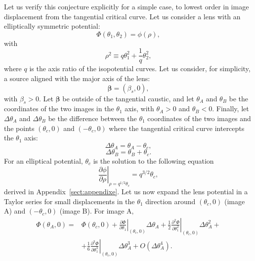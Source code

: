 \documentclass[usenatbib]{mnras}
\begin{document}
Let us verify this conjecture explicitly for a simple case, to lowest order in image displacement from the tangential critical curve.
Let us consider a lens with an elliptically symmetric potential:
\begin{equation}\label{eq:potell}
\Phi(\theta_1, \theta_2) = \phi(\rho),
\end{equation} 
with
\begin{equation}
\rho^2 \equiv q\theta_1^2 + \frac1q\theta_2^2,
\end{equation}
where $q$ is the axis ratio of the isopotential curves.
Let us consider, for simplicity, a source aligned with the major axis of the lens:
\begin{equation}
\boldsymbol\beta = (\beta_s, 0),
\end{equation}
with $\beta_s > 0$.
Let $\boldsymbol\beta$ be outside of the tangential caustic, and let $\theta_A$ and $\theta_B$ be the coordinates of the two images in the $\theta_1$ axis, with $\theta_A > 0$ and $\theta_B < 0$.
Finally, let $\Delta\theta_A$ and $\Delta\theta_B$ be the difference between the $\theta_1$ coordinates of the two images and the points $(\theta_c,0)$ and $(-\theta_c,0)$ where the tangential critical curve intercepts the $\theta_1$ axis:
\begin{equation}
\Delta\theta_A = \theta_A - \theta_c,
\end{equation}
\begin{equation}
\Delta\theta_B = \theta_B + \theta_c.
\end{equation}
For an elliptical potential, $\theta_c$ is the solution to the following equation
\begin{equation}\label{eq:critell}
\left.\frac{\partial\phi}{\partial\rho}\right\rvert_{\rho=q^{1/2}\theta_c} = q^{3/2}\theta_c,
\end{equation}
derived in Appendix~\ref{sect:appendixe}.
Let us now expand the lens potential in a Taylor series for small displacements in the $\theta_1$ direction around $(\theta_c, 0)$ (image A) and $(-\theta_c, 0)$ (image B).
For image A,
\begin{align}
\Phi(\theta_A, 0) = &\Phi(\theta_c, 0) + \left.\frac{\partial\Phi}{\partial\theta_1}\right\rvert_{(\theta_c,0)}\Delta\theta_A + \frac12\left.\frac{\partial^2\Phi}{\partial\theta_1^2}\right\rvert_{(\theta_c,0)}\Delta\theta_A^2 + \nonumber \\
& + \frac16\left.\frac{\partial^3\Phi}{\partial\theta_1^3}\right\rvert_{(\theta_c,0)}\Delta\theta_A^3 + O(\Delta\theta_A^4).
\end{align}
\end{document}
